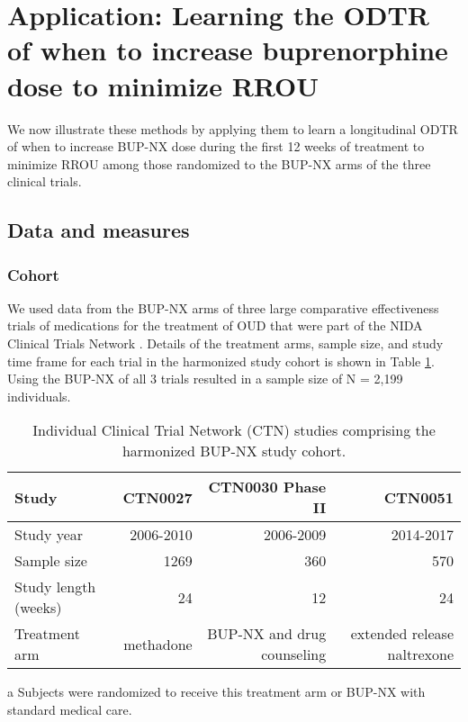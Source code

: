 \documentclass[11pt]{article}
\begin{document}
\section{Application: Learning the ODTR of when to increase buprenorphine dose to minimize RROU}

We now illustrate these methods by applying them to learn a longitudinal ODTR of when to increase BUP-NX dose during the first 12 weeks of treatment to minimize RROU among those randomized to the BUP-NX arms of the three clinical trials. 

\subsection*{Data and measures}

\subsubsection*{Cohort}


We used data from the BUP-NX arms of three large comparative effectiveness trials of medications for the treatment of OUD that were part of the NIDA Clinical Trials Network \citep{potter2013buprenorphine,saxon2013buprenorphine,weiss2010multi,lee2018comparative}. Details of the treatment arms, sample size, and study time frame for each trial in the harmonized study cohort is shown in Table \ref{tab:t0}. Using the BUP-NX of all 3 trials resulted in a sample size of N = 2,199 individuals. 

\begin{table}
	\begin{threeparttable}
		\caption{Individual Clinical Trial Network (CTN) studies comprising the harmonized BUP-NX study cohort.}
		\centering
		\begin{tabular}[t]{l|r|r|r}
			\toprule
			Study & CTN0027 & CTN0030 Phase II & CTN0051\\
			\midrule
			Study year & 2006-2010 & 2006-2009 & 2014-2017 \\
			Sample size & 1269 & 360 & 570 \\
			Study length (weeks) & 24 & 12 & 24 \\
			Treatment arm\tnote{a} & methadone & BUP-NX and drug counseling & extended release naltrexone \\
			\bottomrule
		\end{tabular}
		\begin{tablenotes}
			\item [a] Subjects were randomized to receive this treatment arm or BUP-NX with standard medical care.
		\end{tablenotes}
		\label{tab:t0}
	\end{threeparttable}
\end{table}
\end{document}
